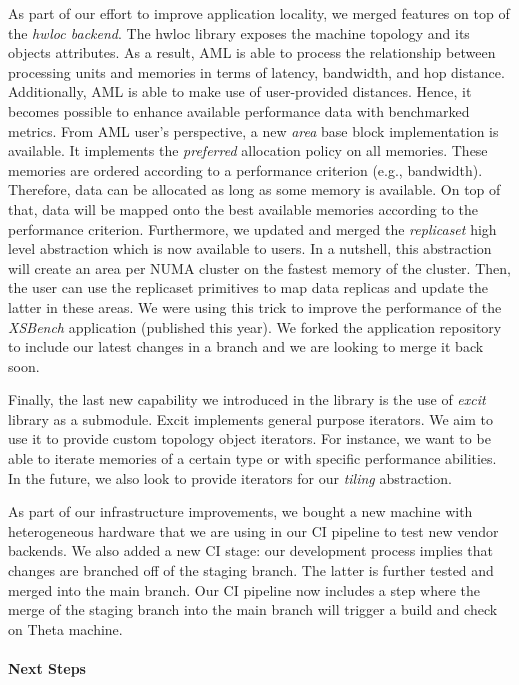 As part of our effort to improve application locality, we merged
features on top of the \emph{hwloc backend}. The hwloc library exposes the machine
topology and its objects attributes. As a result, AML is able
to process the relationship between processing units and memories in
terms of latency, bandwidth, and hop distance. Additionally, AML is
able to make use of user-provided distances. Hence, it becomes
possible to enhance available performance data with benchmarked metrics.
From AML user's perspective, a new \emph{area} base block implementation
is available. It implements the \emph{preferred} allocation policy on all
memories. These memories are ordered according to a performance
criterion (e.g., bandwidth). Therefore, data can be allocated as long as
some memory is available. On top of that, data will be mapped onto the best
available memories according to the performance criterion. Furthermore,
we updated and merged the \emph{replicaset} high level abstraction which
is now available to users. In a nutshell, this abstraction will
create an area per NUMA cluster on the fastest memory of the cluster.
Then, the user can use the replicaset primitives to map data replicas
and update the latter in these areas. We were using this trick to improve
the performance of the
\emph{XSBench} application (published this year). We forked the application
repository to include our latest changes in a branch and we are looking to
merge it back soon.

Finally, the last new capability we introduced in the library is the
use of \emph{excit} library as a submodule. Excit implements general
purpose iterators. We aim to use it to provide custom topology object
iterators. For instance, we want to be able to iterate memories of
a certain type or with specific performance abilities. In the future,
we also look to provide iterators for our \emph{tiling} abstraction.

As part of our infrastructure improvements, we bought a new machine
with heterogeneous hardware that we are using in our CI pipeline
to test new vendor backends. We also added a new CI stage:
our development process implies that changes are branched off of the staging
branch. The latter is further tested and merged into the main branch.
Our CI pipeline now includes a step where the merge of the staging branch into
the main branch will trigger a build and check on Theta machine.

\paragraph{Next Steps}

